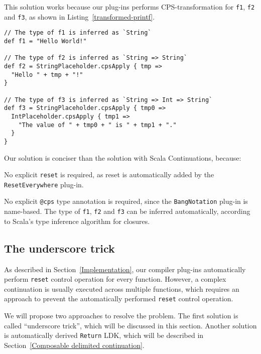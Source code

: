 This solution works because our plug-ins performs CPS-transformation for \lstinline{f1}, \lstinline{f2} and \lstinline{f3}, as shown in Listing~\ref{transformed-printf}.

\begin{lstlisting}[caption={The translated source code of \lstinline{Dsl.scala}-base solution of \lstinline{printf} problem},label={transformed-printf}]
// The type of f1 is inferred as `String`
def f1 = "Hello World!"

// The type of f2 is inferred as `String => String`
def f2 = StringPlaceholder.cpsApply { tmp =>
  "Hello " + tmp + "!"
}

// The type of f3 is inferred as `String => Int => String`
def f3 = StringPlaceholder.cpsApply { tmp0 =>
  IntPlaceholder.cpsApply { tmp1 =>
    "The value of " + tmp0 + " is " + tmp1 + "."
  }
}
\end{lstlisting}

Our solution is conciser than the solution with Scala Continuations, because:
\begin{enumerate*}
  \item No explicit \lstinline{reset} is required, as reset is automatically added by the \lstinline{ResetEverywhere} plug-in.
  \item No explicit \lstinline{@cps} type annotation is required, since the \lstinline{BangNotation} plug-in is name-based. The type of \lstinline{f1}, \lstinline{f2} and \lstinline{f3} can be inferred automatically, according to Scala's type inference algorithm for closures.
\end{enumerate*}

\subsection{The underscore trick}\label{The underscore trick}

As described in Section~\ref{Implementation}, our compiler plug-ins automatically perform \lstinline{reset} control operation for every function. However, a complex continuation is usually executed across multiple functions, which requires an approach to prevent the automatically performed \lstinline{reset} control operation.

We will propose two approaches to resolve the problem. The first solution is called ``underscore trick'', which will be discussed in this section. Another solution is automatically derived \lstinline{Return} LDK, which will be described in Section~\ref{Composable delimited continuation}.

